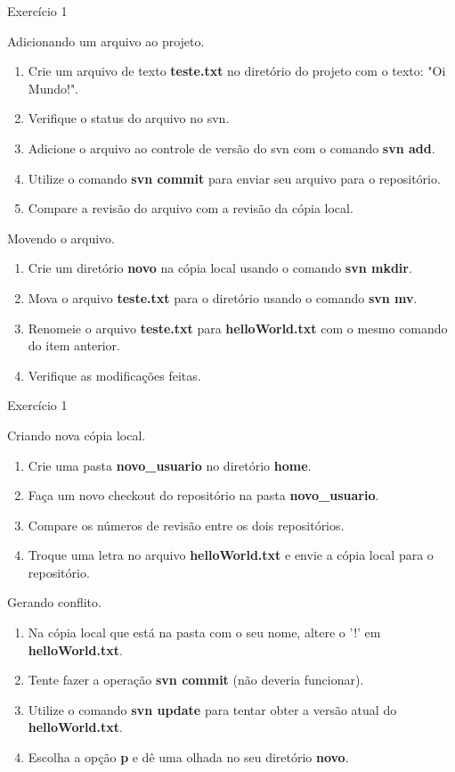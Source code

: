 \documentclass[a4paper]{beamer}
\begin{document}
\begin{frame}{Exercício 1}

Adicionando um arquivo ao projeto.
\begin{enumerate}
\item Crie um arquivo de texto \textbf{teste.txt} no diretório do projeto com o texto: "Oi Mundo!".
\item Verifique o status do arquivo no svn.
\item Adicione o arquivo ao controle de versão do svn com o comando \textbf{svn add}.
\item Utilize o comando \textbf{svn commit} para enviar seu arquivo para o repositório.
\item Compare a revisão do arquivo com a revisão da cópia local.
\end{enumerate}

\pause
\vspace{10pt}
Movendo o arquivo.
\begin{enumerate}
\item Crie um diretório \textbf{novo} na cópia local usando o comando \textbf{svn mkdir}.
\item Mova o arquivo \textbf{teste.txt} para o diretório usando o comando \textbf{svn mv}. 
\item Renomeie o arquivo \textbf{teste.txt} para \textbf{helloWorld.txt} com o mesmo comando do item anterior.
\item Verifique as modificações feitas.
\end{enumerate}

\end{frame}

\begin{frame}{Exercício 1}

Criando nova cópia local.
\begin{enumerate}
\item Crie uma pasta \textbf{novo\_usuario} no diretório \textbf{home}.
\item Faça um novo checkout do repositório na pasta \textbf{novo\_usuario}.
\item Compare os números de revisão entre os dois repositórios.
\item Troque uma letra no arquivo \textbf{helloWorld.txt} e envie a cópia local para o repositório.
\end{enumerate}

\pause
\vspace{10pt}
Gerando conflito.
\begin{enumerate}
\item Na cópia local que está na pasta com o seu nome, altere o '!' em \textbf{helloWorld.txt}.
\item Tente fazer a operação \textbf{svn commit} (não deveria funcionar).
\item Utilize o comando \textbf{svn update} para tentar obter a versão atual do \textbf{helloWorld.txt}.
\item Escolha a opção \textbf{p} e dê uma olhada no seu diretório \textbf{novo}.
\end{enumerate}

\end{frame}
\end{document}
